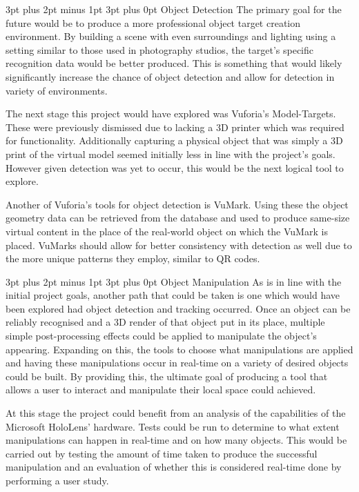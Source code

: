 \documentclass[12pt,a4paper,oneside]{article}
\makeatletter
\renewcommand\subsubsection{\@startsection {subsubsection}{1}{0mm} %
	                           {3pt plus 2pt minus 1pt} %
	                           {3pt plus 0pt} %
	                           {\normalfont\bfseries}}
\makeatother
\begin{document}
\subsubsection{Object Detection}
The primary goal for the future would be to produce a more professional object target creation environment. By building a scene with even surroundings and lighting using a setting similar to those used in photography studios, the target's specific recognition data would be better produced. This is something that would likely significantly increase the chance of object detection and allow for detection in variety of environments.

The next stage this project would have explored was Vuforia's Model-Targets. These were previously dismissed due to lacking a 3D printer which was required for functionality. Additionally capturing a physical object that was simply a 3D print of the virtual model seemed initially less in line with the project's goals. However given detection was yet to occur, this would be the next logical tool to explore. 

Another of Vuforia's tools for object detection is VuMark. Using these the object geometry data can be retrieved from the database and used to produce same-size virtual content in the place of the real-world object on which the VuMark is placed. VuMarks should allow for better consistency with detection as well due to the more unique patterns they employ, similar to QR codes.

\subsubsection{Object Manipulation}
As is in line with the initial project goals, another path that could be taken is one which would have been explored had object detection and tracking occurred. Once an object can be reliably recognised and a 3D render of that object put in its place, multiple simple post-processing effects could be applied to manipulate the object's appearing. Expanding on this, the tools to choose what manipulations are applied and having these manipulations occur in real-time on a variety of desired objects could be built. By providing this, the ultimate goal of producing a tool that allows a user to interact and manipulate their local space could achieved.

At this stage the project could benefit from an analysis of the capabilities of the Microsoft HoloLens' hardware. Tests could be run to determine to what extent manipulations can happen in real-time and on how many objects. This would be carried out by testing the amount of time taken to produce the successful manipulation and an evaluation of whether this is considered real-time done by performing a user study.
\end{document}
